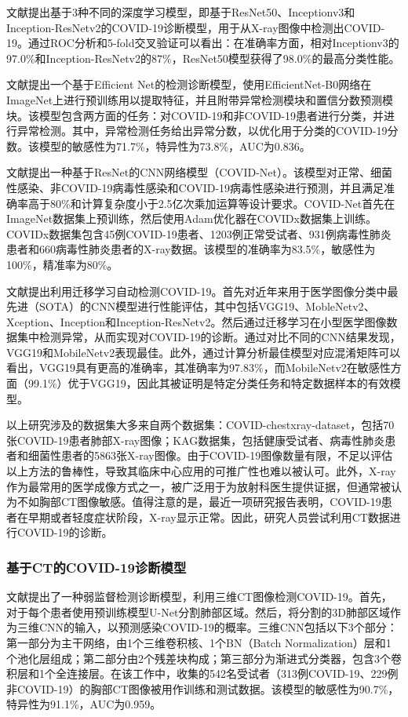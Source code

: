 \documentclass[journal,twoside,web]{ieeecolor}
\begin{document}
文献\cite{b21}提出基于3种不同的深度学习模型，即基于ResNet50、Inceptionv3和Inception-ResNetv2\cite{b22}的COVID-19诊断模型，用于从X-ray图像中检测出COVID-19。通过ROC分析和5-fold交叉验证可以看出：在准确率方面，相对Inceptionv3的97.0\%和Inception-ResNetv2的87\%，ResNet50模型获得了98.0\%的最高分类性能。

文献\cite{b23}提出一个基于Efficient Net\cite{b24}的检测诊断模型，使用EfficientNet-B0网络在ImageNet上进行预训练用以提取特征，并且附带异常检测模块和置信分数预测模块。该模型包含两方面的任务：对COVID-19和非COVID-19患者进行分类，并进行异常检测。其中，异常检测任务给出异常分数，以优化用于分类的COVID-19分数。该模型的敏感性为71.7\%，特异性为73.8\%，AUC为0.836。

文献\cite{b25}提出一种基于ResNet的CNN网络模型（COVID-Net）。该模型对正常、细菌性感染、非COVID-19病毒性感染和COVID-19病毒性感染进行预测，并且满足准确率高于80\%和计算复杂度小于2.5亿次乘加运算等设计要求。COVID-Net首先在ImageNet数据集\cite{b26}上预训练，然后使用Adam优化器在COVIDx数据集上训练。COVIDx数据集包含45例COVID-19患者、1203例正常受试者、931例病毒性肺炎患者和660病毒性肺炎患者的X-ray数据。该模型的准确率为83.5\%，敏感性为100\%，精准率为80\%。

文献\cite{b27}提出利用迁移学习自动检测COVID-19。首先对近年来用于医学图像分类中最先进（SOTA）的CNN模型进行性能评估，其中包括VGG19\cite{b28}、MobleNetv2\cite{b29}、Xception\cite{b30}、Inception和Inception-ResNetv2。然后通过迁移学习\cite{b31}在小型医学图像数据集中检测异常，从而实现对COVID-19的诊断。通过对比不同的CNN结果发现，VGG19和MobileNetv2表现最佳。此外，通过计算分析最佳模型对应混淆矩阵可以看出，VGG19具有更高的准确率，其准确率为97.83\%，而MobileNetv2在敏感性方面（99.1\%）优于VGG19，因此其被证明是特定分类任务和特定数据样本的有效模型。

以上研究涉及的数据集大多来自两个数据集：COVID-chestxray-dataset，包括70张COVID-19患者肺部X-ray图像；KAG数据集，包括健康受试者、病毒性肺炎患者和细菌性患者的5863张X-ray图像。由于COVID-19图像数量有限，不足以评估以上方法的鲁棒性，导致其临床中心应用的可推广性也难以被认可。此外，X-ray作为最常用的医学成像方式之一，被广泛用于为放射科医生提供证据，但通常被认为不如胸部CT图像敏感。值得注意的是，最近一项研究报告表明\cite{b32}，COVID-19患者在早期或者轻度症状阶段，X-ray显示正常。因此，研究人员尝试利用CT数据进行COVID-19的诊断。
\subsubsection{基于CT的COVID-19诊断模型}

文献\cite{b33}提出了一种弱监督检测诊断模型，利用三维CT图像检测COVID-19。首先，对于每个患者使用预训练模型U-Net分割肺部区域。然后，将分割的3D肺部区域作为三维CNN的输入，以预测感染COVID-19的概率。三维CNN包括以下3个部分：第一部分为主干网络，由1个三维卷积核、1个BN（Batch Normalization）层和1个池化层组成；第二部分由2个残差块构成；第三部分为渐进式分类器，包含3个卷积层和1个全连接层。在该工作中，收集的542名受试者（313例COVID-19、229例非COVID-19）的胸部CT图像被用作训练和测试数据。该模型的敏感性为90.7\%，特异性为91.1\%，AUC为0.959。
\end{document}
